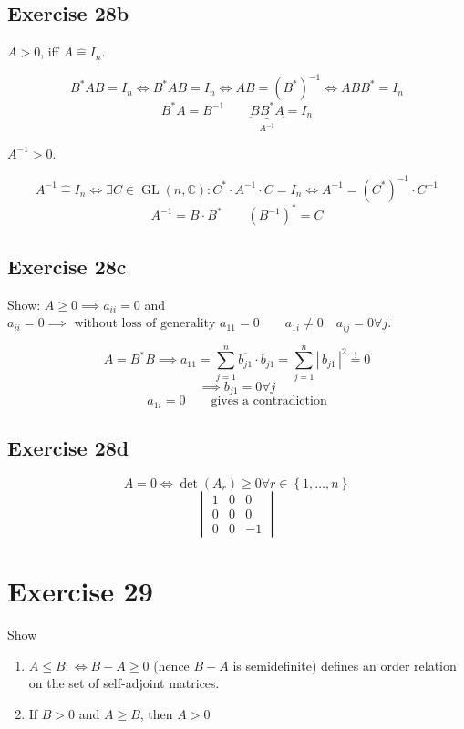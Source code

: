 \documentclass[a4paper]{article}
\theoremstyle{definition}
\newcommand\set[1]{\left\{#1\right\}}
\newcommand\card[1]{\left|\,#1\,\right|}
\begin{document}
\subsection{Exercise 28b}

$A > 0$, iff $A \hat= I_n$.

\[ B^* AB = I_n \iff B^* AB = I_n \iff AB = (B^*)^{-1} \iff ABB^* = I_n \]
\[ B^*A = B^{-1} \qquad \underbrace{BB^* A}_{A^{-1}} = I_n \]

$A^{-1} > 0$.

\[ A^{-1} \hat= I_n \iff \exists C \in \operatorname{GL}(n, \mathbb C): C^* \cdot A^{-1} \cdot C = I_n \iff A^{-1} = (C^*)^{-1} \cdot C^{-1} \]
\[ A^{-1} = B \cdot B^* \qquad (B^{-1})^* = C \]

\subsection{Exercise 28c}

Show: $A \geq 0 \implies a_{ii} = 0$ and $a_{ii} = 0 \implies \text{ without loss of generality } a_{11} = 0 \qquad a_{1i} \neq 0 \quad a_{ij} = 0 \forall j$.

\[ A = B^* B \implies a_{11} = \sum_{j=1}^n \overline{b_{j1}} \cdot b_{j1} = \sum_{j=1}^n \card{b_{j1}}^2 \overset!= 0 \]
\[ \implies b_{j1} = 0 \forall j \]
\[ a_{1i} = 0 \qquad \text{gives a contradiction} \]

\subsection{Exercise 28d}

\[ A = 0 \iff \det(A_r) \geq 0 \forall r \in \set{1, \ldots, n} \]
\[
  \begin{vmatrix}
    1 & 0 & 0 \\
    0 & 0 & 0 \\
    0 & 0 & -1
  \end{vmatrix}
\]

\section*{Exercise 29}
\begin{ex}
  Show
  \begin{enumerate}
    \item $A \leq B :\iff B - A \geq 0$ (hence $B-A$ is semidefinite) defines an order relation on the set of self-adjoint matrices.
    \item If $B > 0$ and $A \geq B$, then $A > 0$
  \end{enumerate}
\end{ex}
\end{document}

